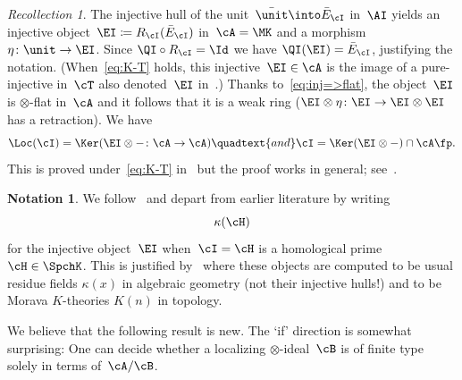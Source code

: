 \documentclass[11pt]{amsart}
\numberwithin{equation}{section} %
\theoremstyle{plain}
\theoremstyle{definition}
\newtheorem{ntn}[equation]{Notation}
\theoremstyle{remark}
\newtheorem{rec}[equation]{Recollection}
\begin{document}
%
\begin{rec}
\label{rec:E_I}%
The injective hull of the unit~$\bar{\unit}\into \bar{E}_{\cI}$ in~$\AI$ yields an injective object~$\EI\coloneq R_{\cI}(\bar{E}_{\cI})$ in~$\cA=\MK$ and a morphism~$\eta\colon \unit\to \EI$. Since $\QI\circ R_{\cI}=\Id$ we have $\QI(\EI)=\bar{E}_{\cI}$, justifying the notation.
(When~\eqref{eq:K-T} holds, this injective~$\EI\in\cA$ is the image of a pure-injective in~$\cT$ also denoted~$\EI$ in~\cite{BalmerKrauseStevenson19}.)
Thanks to~\eqref{eq:inj=>flat}, the object~$\EI$ is $\otimes$-flat in~$\cA$ and it follows that it is a weak ring ($\EI\otimes\eta\colon \EI\to \EI\otimes\EI$ has a retraction). We have 
%
\begin{equation}
\label{eq:EI}%
\Loc(\cI)=\Ker(\EI\otimes-\colon \cA\to \cA) 
\quadtext{and}
\cI=\Ker(\EI\otimes-)\cap \cA\fp.
\end{equation}
%
This is proved under~\eqref{eq:K-T} in~\cite{BalmerKrauseStevenson19} but the proof works in general; see~\cite[\S\,2]{BirdWilliamson26}.
\end{rec}

%
\begin{ntn}
We follow~\cite{VanRooy26} and depart from earlier literature by writing
%
\[
\kappa(\cH)
\]
%
for the injective object~$\EI$ when~$\cI=\cH$ is a homological prime~$\cH\in\SpchK$.
This is justified by~\cite{BalmerCameron21} where these objects are computed to be usual residue fields $\kappa(x)$ in algebraic geometry (not their injective hulls!) and to be Morava $K$-theories $K(n)$ in topology.
\end{ntn}

We believe that the following result is new. The `if' direction is somewhat surprising: One can decide whether a localizing $\otimes$-ideal~$\cB$ is of finite type solely in terms of~$\cA/\cB$.
\end{document}
